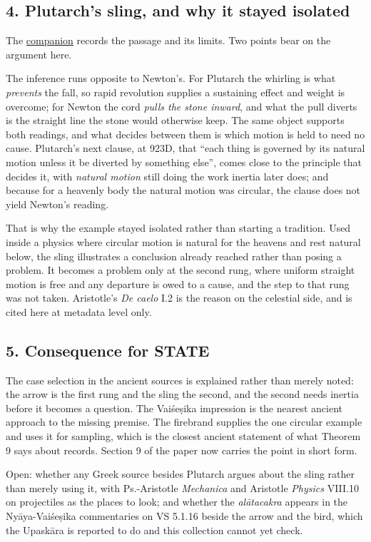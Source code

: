 \documentclass[11pt,a4paper]{article}
\begin{document}
\hypertarget{plutarchs-sling-and-why-it-stayed-isolated}{%
\subsection{4. Plutarch's sling, and why it stayed
isolated}\label{plutarchs-sling-and-why-it-stayed-isolated}}

The
\href{../docs/classics/Plutarch_DeFacie_923_sling_moon.md}{companion}
records the passage and its limits. Two points bear on the argument
here.

The inference runs opposite to Newton's. For Plutarch the whirling is
what \emph{prevents} the fall, so rapid revolution supplies a sustaining
effect and weight is overcome; for Newton the cord \emph{pulls the stone
inward}, and what the pull diverts is the straight line the stone would
otherwise keep. The same object supports both readings, and what decides
between them is which motion is held to need no cause. Plutarch's next
clause, at 923D, that ``each thing is governed by its natural motion
unless it be diverted by something else'', comes close to the principle
that decides it, with \emph{natural motion} still doing the work inertia
later does; and because for a heavenly body the natural motion was
circular, the clause does not yield Newton's reading.

That is why the example stayed isolated rather than starting a
tradition. Used inside a physics where circular motion is natural for
the heavens and rest natural below, the sling illustrates a conclusion
already reached rather than posing a problem. It becomes a problem only
at the second rung, where uniform straight motion is free and any
departure is owed to a cause, and the step to that rung was not taken.
Aristotle's \emph{De caelo} I.2 is the reason on the celestial side, and
is cited here at metadata level only.

\hypertarget{consequence-for-state}{%
\subsection{5. Consequence for STATE}\label{consequence-for-state}}

The case selection in the ancient sources is explained rather than
merely noted: the arrow is the first rung and the sling the second, and
the second needs inertia before it becomes a question. The Vaiśeṣika
impression is the nearest ancient approach to the missing premise. The
firebrand supplies the one circular example and uses it for sampling,
which is the closest ancient statement of what Theorem 9 says about
records. Section 9 of the paper now carries the point in short form.

Open: whether any Greek source besides Plutarch argues about the sling
rather than merely using it, with Ps.-Aristotle \emph{Mechanica} and
Aristotle \emph{Physics} VIII.10 on projectiles as the places to look;
and whether the \emph{alātacakra} appears in the Nyāya-Vaiśeṣika
commentaries on VS 5.1.16 beside the arrow and the bird, which the
Upaskāra is reported to do and this collection cannot yet check.
\end{document}
